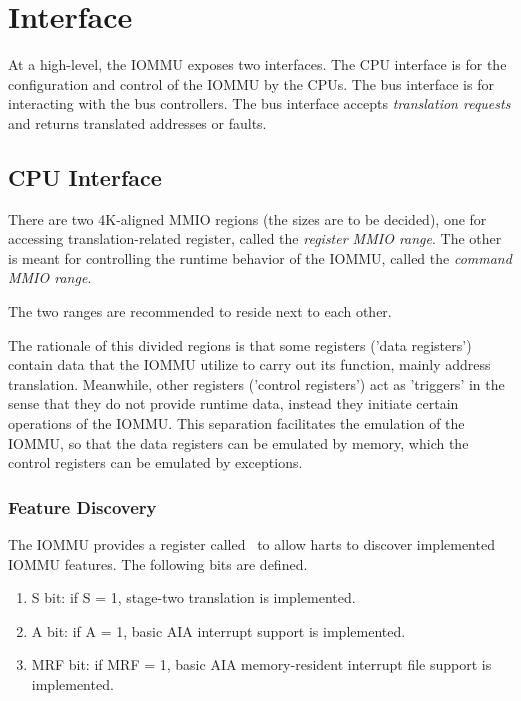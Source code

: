 \section{Interface}

At a high-level, the IOMMU exposes two interfaces. The CPU interface is for the
configuration and control of the IOMMU by the CPUs. The bus interface is for interacting
with the bus controllers. The bus interface accepts \textit{translation requests} and
returns translated addresses or faults.

\subsection{CPU Interface}

There are two 4K-aligned MMIO regions (the sizes are to be decided), one for accessing
translation-related register, called the \textit{register MMIO range}. The other is meant
for controlling the runtime behavior of the IOMMU, called the \textit{command MMIO range}.

\note The two ranges are recommended to reside next to each other.

The rationale of this divided regions is that some registers ('data registers') contain
data that the IOMMU utilize to carry out its function, mainly address translation.
Meanwhile, other registers ('control registers') act as 'triggers' in the sense that they
do not provide runtime data, instead they initiate certain operations of the IOMMU. This
separation facilitates the emulation of the IOMMU, so that the data registers can be
emulated by memory, which the control registers can be emulated by exceptions.

\subsubsection{Feature Discovery}

The IOMMU provides a register called \iommucap\ to allow harts to discover implemented
IOMMU features. The following bits are defined.

\begin{enumerate}
    \item S  bit: if S = 1, stage-two translation is implemented.
    \item A  bit: if A = 1, basic AIA interrupt support is implemented.
    \item MRF  bit: if MRF = 1, basic AIA memory-resident interrupt file support is implemented.
\end{enumerate}

